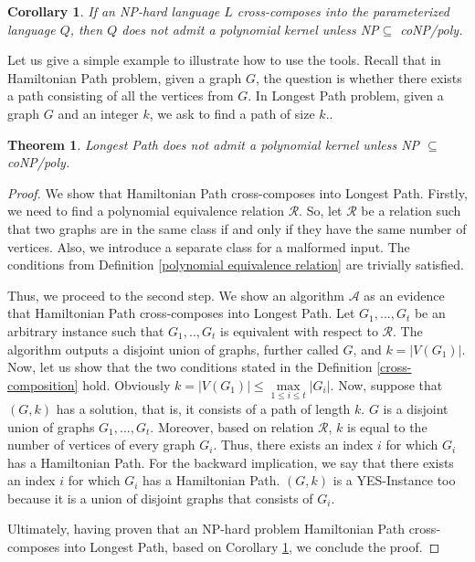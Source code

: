 \documentclass[en]{pracamgr}
\newtheorem{theorem}{Theorem}
\newtheorem{corollary}{Corollary}
\begin{document}
\begin{corollary}\label{nokernel}
	If an NP-hard language $L$ cross-composes into the parameterized language $Q$, then $Q$ does not admit a polynomial kernel unless \textup{NP$\subseteq$ coNP/poly}.
\end{corollary}

Let us give a simple example to illustrate how to use the tools. Recall that in {\sc Hamiltonian Path} problem, given a graph $G$, the question is whether there exists a path consisting of all the vertices from $G$. In {\sc Longest Path} problem, given a graph $G$ and an integer $k$, we ask to find a path of size $k$.. 

\begin{theorem}
	{\sc Longest Path} does not admit a polynomial kernel unless NP $\subseteq$ coNP/poly.
\end{theorem}

\begin{proof}	
	 We show that {\sc Hamiltonian Path} cross-composes into {\sc Longest Path}. Firstly, we need to find a polynomial equivalence relation $\mathcal{R}$. So, let $\mathcal{R}$ be a relation such that two graphs are in the same class if and only if they have the same number of vertices. Also, we introduce a separate class for a malformed input. The conditions from Definition \ref{polynomial equivalence relation} are trivially satisfied. 
	
	Thus, we proceed to the second step. We show an algorithm $\mathcal{A}$ as an evidence that  {\sc Hamiltonian Path} cross-composes into {\sc Longest Path}. Let $G_1,...,G_t$ be an arbitrary instance such that $G_1,..,G_t$ is equivalent with respect to $\mathcal{R}$. The algorithm outputs a disjoint union of graphs, further called $G$, and $k=|V(G_1)|$. Now, let us show that the two conditions stated in the Definition \ref{cross-composition} hold. Obviously $k=|V(G_1)| \leq \max\limits_{1 \leq i \leq t} |G_i|$. Now, suppose that $(G,k)$ has a solution, that is, it consists of a path of length $k$. $G$ is a disjoint union of graphs $G_1,...,G_t$. Moreover, based on relation $\mathcal{R}$, $k$ is equal to the number of vertices of every graph $G_i$. Thus, there exists an index $i$ for which $G_i$ has a Hamiltonian Path. For the backward implication, we say that there exists an index $i$ for which $G_i$ has a Hamiltonian Path. $(G,k)$ is a YES-Instance too because it is a union of disjoint graphs that consists of $G_i$.
	
	Ultimately, having proven that an NP-hard problem {\sc Hamiltonian Path} cross-composes into {\sc Longest Path}, based on Corollary \ref{nokernel}, we conclude the proof.
\end{proof}
\end{document}
